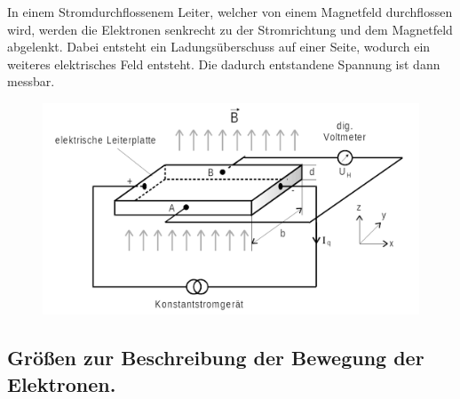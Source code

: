 \noindent In einem Stromdurchflossenem Leiter, welcher von einem Magnetfeld durchflossen wird, werden die Elektronen senkrecht
zu der Stromrichtung und dem Magnetfeld abgelenkt. Dabei entsteht ein Ladungsüberschuss auf einer Seite, wodurch 
ein weiteres elektrisches Feld entsteht. Die dadurch entstandene Spannung ist dann messbar.
\begin{figure}[H]
    \centering
    \includegraphics{Bilder/Halleffekt.png}
    \label{fig:Halleffekt}
\end{figure}

\subsection{Größen zur Beschreibung der Bewegung der Elektronen.}

